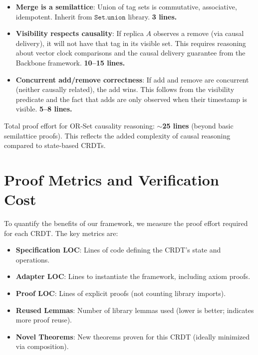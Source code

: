 \begin{itemize}
  \item \textbf{Merge is a semilattice}: Union of tag sets is commutative, associative, idempotent. Inherit from $\texttt{Set.union}$ library. \textbf{3 lines.}
  
  \item \textbf{Visibility respects causality}: If replica $A$ observes a remove (via causal delivery), it will not have that tag in its visible set. This requires reasoning about vector clock comparisons and the causal delivery guarantee from the Backbone framework. \textbf{10--15 lines.}
  
  \item \textbf{Concurrent add/remove correctness}: If add and remove are concurrent (neither causally related), the add wins. This follows from the visibility predicate and the fact that adds are only observed when their timestamp is visible. \textbf{5--8 lines.}
\end{itemize}

Total proof effort for OR-Set causality reasoning: \textbf{$\sim$25 lines} (beyond basic semilattice proofs). This reflects the added complexity of causal reasoning compared to state-based CRDTs.

\section{Proof Metrics and Verification Cost}

\label{sec:proof-metrics}

To quantify the benefits of our framework, we measure the proof effort required for each CRDT. The key metrics are:

\begin{itemize}
  \item \textbf{Specification LOC}: Lines of code defining the CRDT's state and operations.
  \item \textbf{Adapter LOC}: Lines to instantiate the framework, including axiom proofs.
  \item \textbf{Proof LOC}: Lines of explicit proofs (not counting library imports).
  \item \textbf{Reused Lemmas}: Number of library lemmas used (lower is better; indicates more proof reuse).
  \item \textbf{Novel Theorems}: New theorems proven for this CRDT (ideally minimized via composition).
\end{itemize}

